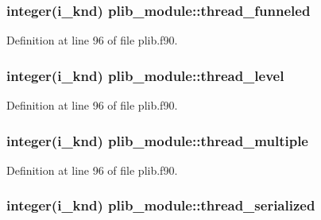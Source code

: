 \hypertarget{classplib__module_aaf61faf216e801843c4b8121eab84956}{
\subsubsection[{thread\-\_\-funneled}]{\setlength{\rightskip}{0pt plus 5cm}integer(i\-\_\-knd) plib\-\_\-module\-::thread\-\_\-funneled}}\label{classplib__module_aaf61faf216e801843c4b8121eab84956}


Definition at line 96 of file plib.\-f90.

\hypertarget{classplib__module_a704c693732d15c474f76b340e3b1c54f}{
\subsubsection[{thread\-\_\-level}]{\setlength{\rightskip}{0pt plus 5cm}integer(i\-\_\-knd) plib\-\_\-module\-::thread\-\_\-level}}\label{classplib__module_a704c693732d15c474f76b340e3b1c54f}


Definition at line 96 of file plib.\-f90.

\hypertarget{classplib__module_af4045f02bfdd6ce98120023046d4c1ca}{
\subsubsection[{thread\-\_\-multiple}]{\setlength{\rightskip}{0pt plus 5cm}integer(i\-\_\-knd) plib\-\_\-module\-::thread\-\_\-multiple}}\label{classplib__module_af4045f02bfdd6ce98120023046d4c1ca}


Definition at line 96 of file plib.\-f90.

\hypertarget{classplib__module_a117ac57a3b41c9fae508f8674fe45f0f}{
\subsubsection[{thread\-\_\-serialized}]{\setlength{\rightskip}{0pt plus 5cm}integer(i\-\_\-knd) plib\-\_\-module\-::thread\-\_\-serialized}}\label{classplib__module_a117ac57a3b41c9fae508f8674fe45f0f}


